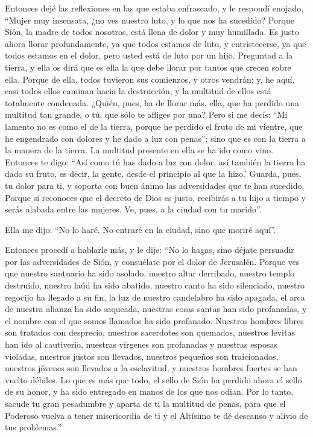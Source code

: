 Entonces dejé las reflexiones en las que estaba
enfrascado, y le respondí enojado,  ``Mujer muy insensata,
¿no ves nuestro luto, y lo que nos ha sucedido?  Porque
Sión, la madre de todos nosotros, está llena de dolor y muy humillada.
 Es justo ahora llorar profundamente, ya que todos estamos
de luto, y entristecerse, ya que todos estamos en el dolor, pero usted
está de luto por un hijo.  Preguntad a la tierra, y ella
os dirá que es ella la que debe llorar por tantos que crecen sobre ella.
 Porque de ella, todos tuvieron sus comienzos, y otros
vendrán; y, he aquí, casi todos ellos caminan hacia la destrucción, y la
multitud de ellos está totalmente condenada.  ¿Quién,
pues, ha de llorar más, ella, que ha perdido una multitud tan grande, o
tú, que sólo te afliges por una?  Pero si me decís: ``Mi
lamento no es como el de la tierra, porque he perdido el fruto de mi
vientre, que he engendrado con dolores y he dado a luz con penas'';
 sino que es con la tierra a la manera de la tierra. La
multitud presente en ella se ha ido como vino.  Entonces
te digo: ``Así como tú has dado a luz con dolor, así también la tierra
ha dado su fruto, es decir, la gente, desde el principio al que la
hizo.'  Guarda, pues, tu dolor para ti, y soporta con
buen ánimo las adversidades que te han sucedido.  Porque
si reconoces que el decreto de Dios es justo, recibirás a tu hijo a
tiempo y serás alabada entre las mujeres.  Ve, pues, a la
ciudad con tu marido''.

 Ella me dijo: ``No lo haré. No entraré en la ciudad,
sino que moriré aquí''.

 Entonces procedí a hablarle más, y le dije:
 ``No lo hagas, sino déjate persuadir por las
adversidades de Sión, y consuélate por el dolor de Jerusalén.
 Porque ves que nuestro santuario ha sido asolado,
nuestro altar derribado, nuestro templo destruido, 
nuestro laúd ha sido abatido, nuestro canto ha sido silenciado, nuestro
regocijo ha llegado a su fin, la luz de nuestro candelabro ha sido
apagada, el arca de nuestra alianza ha sido saqueada, nuestras cosas
santas han sido profanadas, y el nombre con el que somos llamados ha
sido profanado. Nuestros hombres libres son tratados con desprecio,
nuestros sacerdotes son quemados, nuestros levitas han ido al
cautiverio, nuestras vírgenes son profanadas y nuestras esposas
violadas, nuestros justos son llevados, nuestros pequeños son
traicionados, nuestros jóvenes son llevados a la esclavitud, y nuestros
hombres fuertes se han vuelto débiles.  Lo que es más que
todo, el sello de Sión ha perdido ahora el sello de su honor, y ha sido
entregado en manos de los que nos odian.  Por lo tanto,
sacude tu gran pesadumbre y aparta de ti la multitud de penas, para que
el Poderoso vuelva a tener misericordia de ti y el Altísimo te dé
descanso y alivio de tus problemas.''

